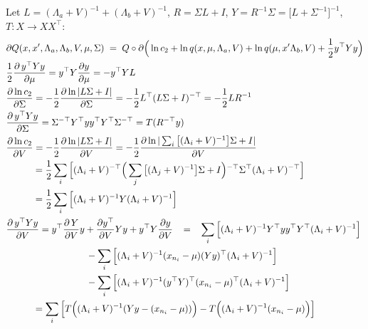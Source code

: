 \documentclass{article}
\newcommand{\inv}{^{-1}}
\newcommand{\invt}{{^{-\top}}}
\begin{document}
Let
$L=(\Lambda_a+V)\inv+(\Lambda_b+V)\inv$,
$R=\Sigma L+I$,
$Y=R\inv \Sigma=\big[L+\Sigma\inv\big]\inv$,
$T: X \rightarrow XX^\top$:
\begin{equation}
\begin{split}
&\partial Q(x,x',\Lambda_a,\Lambda_b,V, \mu, \Sigma)
\;=\; Q \circ \partial \Big( \ln c_2 + \ln q(x,\mu,\Lambda_a,V) +
\ln q(\mu,x'\Lambda_b,V) +
\frac{1}{2} y^\top Y y \Big) \\
&\frac{1}{2}\frac{\partial \, y^\top Y y}{\partial \mu} =
y^\top  Y \frac{\partial y}{\partial \mu} = -y^\top YL \\
& \frac{\partial \ln c_2}{\partial \Sigma} = -\frac{1}{2}\frac{\partial \ln |L\Sigma +I|}{\partial\Sigma} =
-\frac{1}{2}L^\top(L \Sigma+I)\invt = -\frac{1}{2}LR\inv \\
&\frac{\partial \, y^\top Y y}{\partial \Sigma} =
\Sigma\invt Y^\top yy^\top  Y^\top\Sigma\invt =
T(R\invt y) \\
& \frac{\partial \ln c_2}{\partial V} = -\frac{1}{2}\frac{\partial \ln |L\Sigma +I|}{\partial V} =
-\frac{1}{2}\frac{\partial \ln |\sum_i \big[(\Lambda_i+V)\inv\big]\Sigma +I|}{\partial V} \\
&\hspace{1.0cm} = \frac{1}{2} \sum_i \Big[ (\Lambda_i+V)\invt \Big(\sum_j \big[(\Lambda_j+V)\inv\big]\Sigma +I\Big)\invt \Sigma^\top (\Lambda_i+V)\invt \Big]
\\
&\hspace{1.0cm} =
\frac{1}{2} \sum_i \Big[ (\Lambda_i+V)\inv Y (\Lambda_i+V)\inv \Big]
\\
%
&\frac{\partial \, y^\top Y y}{\partial V} =
y^\top \frac{\partial \,  Y}{\partial V} y +
 \frac{\partial y^\top}{\partial V} Y y +  y^\top Y \frac{\partial y}{\partial V}
\;\;\; = \;\;\;  \sum_i \Big[ (\Lambda_i+V)\inv Y^\top yy^\top Y^\top (\Lambda_i+V)\inv \Big] \\
&\hspace{3.0cm}
- \sum_i \Big[ (\Lambda_i+V)\inv (x_{n_i}-\mu) (Y y)^\top (\Lambda_i+V)\inv \Big] \\
&\hspace{3.0cm} - \sum_i \Big[ (\Lambda_i+V)\inv (y^\top Y)^\top (x_{n_i}-\mu)^\top (\Lambda_i+V)\inv \Big] \\
&\hspace{1.0cm} =   \sum_i \Big[ T \Big( (\Lambda_i+V)\inv (Yy - (x_{n_i}-\mu)) \Big) -
T \Big( (\Lambda_i+V)\inv (x_{n_i}-\mu) \Big) \Big]
\end{split}
\end{equation}
\end{document}
